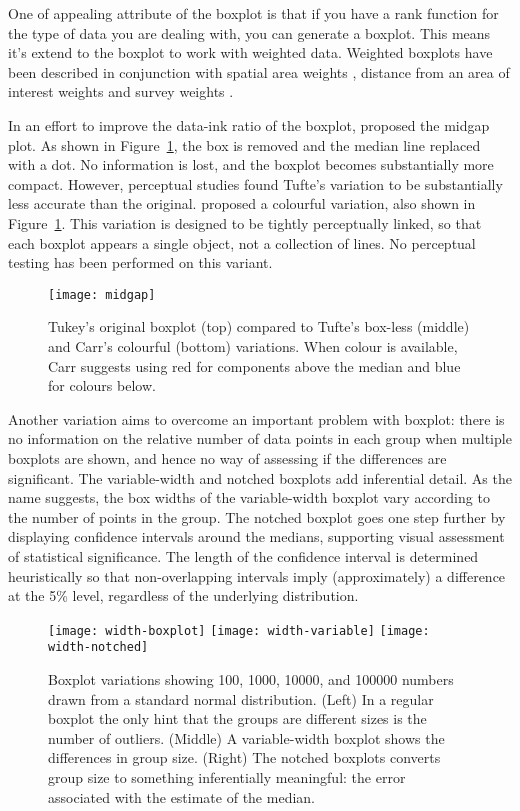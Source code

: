 \documentclass[oneside]{article}
\begin{document}
One of appealing attribute of the boxplot is that if you have a rank function for the type of data you are dealing with, you can generate a boxplot. This means it's extend to the boxplot to work with weighted data. Weighted boxplots have been described in conjunction with spatial area weights \citep{willmott:2007}, distance from an area of interest weights \citep{dykes:2007} and survey weights \citep{survey,korn:1998}.


In an effort to improve the data-ink ratio of the boxplot, \citep{tufte:2001} proposed the midgap plot. As shown in Figure~\ref{fig:tufte}, the box is removed and the median line replaced with a dot. No information is lost, and the boxplot becomes substantially more compact. However, perceptual studies \citep{stock:1991} found Tufte's variation to be substantially less accurate than the original. \citet{carr:1994a} proposed a colourful variation, also shown in Figure~\ref{fig:tufte}. This variation is designed to be tightly perceptually linked, so that each boxplot appears a single object, not a collection of lines. No perceptual testing has been performed on this variant.

\begin{figure}[htbp]
  \centering
  \texttt{[image: midgap]}
  \caption{Tukey's original boxplot (top) compared to Tufte's box-less (middle) and Carr's colourful (bottom) variations. When colour is available, Carr suggests using red for components above the median and blue for colours below.}
  \label{fig:tufte}
\end{figure}

Another variation aims to overcome an important problem with boxplot: there is no information on the relative number of data points in each group when multiple boxplots are shown, and hence no way of assessing if the differences are significant. The variable-width and notched boxplots \citep{mcgill:1978} add inferential detail. As the name suggests, the box widths of the variable-width boxplot vary according to the number of points in the group. The notched boxplot goes one step further by displaying confidence intervals around the medians, supporting visual assessment of statistical significance. The length of the confidence interval is determined heuristically so that non-overlapping intervals imply (approximately) a difference at the 5\% level, regardless of the underlying distribution.

\begin{figure}[htbp]
  \centering
  \texttt{[image: width-boxplot]}%
  \texttt{[image: width-variable]}%
  \texttt{[image: width-notched]}
  \caption{Boxplot variations showing 100, 1000, 10000, and 100000 numbers drawn from a standard normal distribution.  (Left) In a regular boxplot the only hint that the groups are different sizes is the number of outliers. (Middle) A variable-width boxplot shows the differences in group size.  (Right) The notched boxplots converts group size to something inferentially meaningful: the error associated with the estimate of the median.}
  \label{fig:width}
\end{figure}
\end{document}
